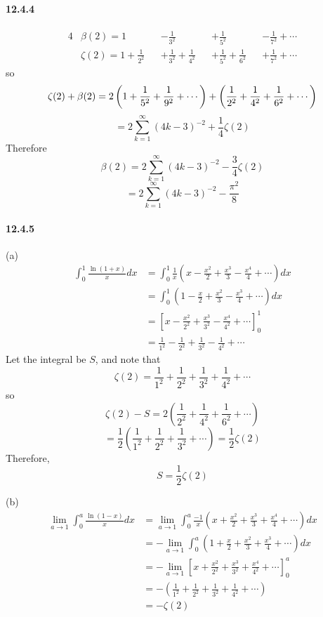 \documentclass[a4paper]{article}
\begin{document}
\paragraph{12.4.4}
\begin{alignat*}{4}
    & \beta(2)=1 && -\frac{1}{3^2} && +\frac{1}{5^2} && -\frac{1}{7^2}+\cdots \\
    & \zeta(2)=1+\frac{1}{2^2} && +\frac{1}{3^2}+\frac{1}{4^2} && +\frac{1}{5^2}+\frac{1}{6^2} && +\frac{1}{7^2}+\cdots
\end{alignat*}
so
\[
\zeta(2)+\beta(2)=2\left(1+\frac{1}{5^2}+\frac{1}{9^2}+\cdots\right)+\left(\frac{1}{2^2}+\frac{1}{4^2}+\frac{1}{6^2}+\cdots\right)
\]
\[
=2\sum_{k=1}^\infty(4k-3)^{-2}+\frac{1}{4}\zeta(2)
\]
Therefore
\[
\beta(2)=2\sum_{k=1}^\infty(4k-3)^{-2}-\frac{3}{4}\zeta(2)
\]
\[
=2\sum_{k=1}^\infty(4k-3)^{-2}-\frac{\pi^2}{8}
\]

\paragraph{12.4.5}
(a)
\begin{equation*}
    \begin{split}
        \int_0^1\frac{\ln(1+x)}{x}dx & =\int_0^1\frac{1}{x}\left(x-\frac{x^2}{2}+\frac{x^3}{3}-\frac{x^4}{4}+\cdots\right)dx\\
        & =\int_0^1\left(1-\frac{x}{2}+\frac{x^2}{3}-\frac{x^3}{4}+\cdots \right)dx\\
        & =\left[x-\frac{x^2}{2^2}+\frac{x^3}{3^2}-\frac{x^4}{4^2}+\cdots \right]_0^1\\
        & =\frac{1}{1^2}-\frac{1}{2^2}+\frac{1}{3^2}-\frac{1}{4^2}+\cdots
    \end{split}
\end{equation*}
Let the integral be $S$, and note that
\[
\zeta(2)=\frac{1}{1^2}+\frac{1}{2^2}+\frac{1}{3^2}+\frac{1}{4^2}+\cdots
\]
so
\[
\zeta(2)-S=2\left(\frac{1}{2^2}+\frac{1}{4^2}+\frac{1}{6^2}+\cdots \right)
\]
\[
=\frac{1}{2}\left(\frac{1}{1^2}+\frac{1}{2^2}+\frac{1}{3^2}+\cdots \right)=\frac{1}{2}\zeta(2)
\]
Therefore,
\[
S=\frac{1}{2}\zeta(2)
\]

(b)
\begin{equation*}
    \begin{split}
        \lim_{a\to1}\int_0^a\frac{\ln(1-x)}{x}dx & =\lim_{a\to1}\int_0^a\frac{-1}{x}\left(x+\frac{x^2}{2}+\frac{x^3}{3}+\frac{x^4}{4}+\cdots \right)dx \\
        & =-\lim_{a\to1}\int_0^a\left(1+\frac{x}{2}+\frac{x^2}{3}+\frac{x^3}{4}+\cdots \right)dx\\
        & =-\lim_{a\to1}\left[x+\frac{x^2}{2^2}+\frac{x^3}{3^2}+\frac{x^4}{4^2}+\cdots \right]_0^a\\
        & =-\left(\frac{1}{1^2}+\frac{1}{2^2}+\frac{1}{3^2}+\frac{1}{4^2}+\cdots \right)\\
        & =-\zeta(2)
    \end{split}
\end{equation*}
\end{document}
